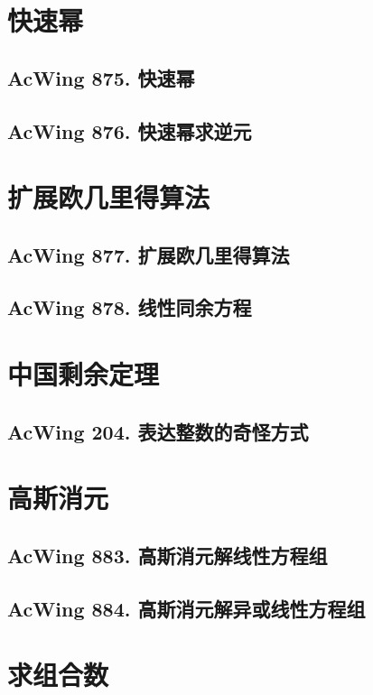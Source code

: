 \section{快速幂}

\subsection{AcWing 875. 快速幂}

\subsection{AcWing 876. 快速幂求逆元}


\section{扩展欧几里得算法}

\subsection{AcWing 877. 扩展欧几里得算法}

\subsection{AcWing 878. 线性同余方程}


\section{中国剩余定理}

\subsection{AcWing 204. 表达整数的奇怪方式}


\section{高斯消元}

\subsection{AcWing 883. 高斯消元解线性方程组}

\subsection{AcWing 884. 高斯消元解异或线性方程组}


\section{求组合数}


